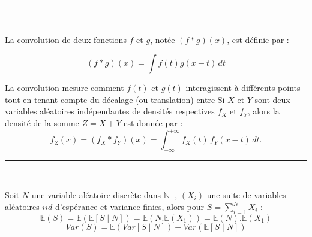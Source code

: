 \hrule
\begin{f}{\ }
	
	La convolution de deux fonctions \( f \) et \( g \), notée \( (f * g)(x) \), est définie par :
	
	\[
	(f * g)(x) = \int f(t) g(x - t) \, dt
	\]
	
	La convolution mesure comment \( f(t) \) et \( g(t) \) interagissent à différents points tout en tenant compte du décalage (ou translation) entre 
	Si \(X\) et \(Y\) sont deux variables aléatoires indépendantes de densités respectives \(f_X\) et \(f_Y\), alors la densité de la somme \(Z = X + Y\) est donnée par :
\[
f_Z(x) = (f_X * f_Y)(x) = \int_{-\infty}^{+\infty} f_X(t)\, f_Y(x - t)\, dt.
\]

\end{f}
\hrule
\begin{f}
	{\ }
	
	Soit \(N\) une variable aléatoire discrète dans \(\mathbb{N}^+\), \(\left(X_i\right)\) une suite de variables aléatoires \(iid\) d'espérance et variance finies, alors pour  \(\displaystyle S=\sum_{i=1}^{N}X_i\) :
	\[
	\mathbb{E}(S) = \mathbb{E} (\mathbb{E} [S \mid N]) = \mathbb{E} (N.\mathbb{E}(X_1)) = \mathbb{E}(N).\mathbb{E}(X_1)
	\]
	\[
	Var (S) = \mathbb{E} (Var [S \mid N]) + Var (\mathbb{E} [S \mid N])
	\]
\end{f}

